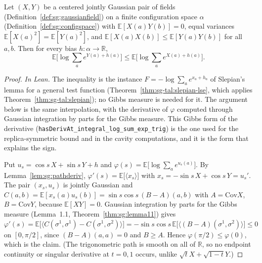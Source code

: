 \begin{theorem}\label{thm:sg:comparison}
  \leanok
Let $(X,Y)$ be a centered jointly Gaussian pair of fields (Definition~\ref{def:sg:gaussianfield}) on a finite configuration space $\alpha$ (Definition~\ref{def:sg:configspace}) with $\mathbb E[X(a)Y(b)]=0$, equal variances
$\mathbb E[X(a)^2]=\mathbb E[Y(a)^2]$, and $\mathbb E[X(a)X(b)]\le\mathbb E[Y(a)Y(b)]$ for all $a,b$. Then for every bias $h:\alpha\to\mathbb R$,
\[\mathbb E\big[\log\sum_ae^{Y(a)+h(a)}\big]\le\mathbb E\big[\log\sum_ae^{X(a)+h(a)}\big].\]
\end{theorem}

\begin{proof}
  \leanok
\emph{In Lean.} The inequality is the instance $F=-\log\sum_ae^{x_a+h_a}$ of Slepian's lemma for a general test function (Theorem~\ref{thm:sg-tal:slepian-lse}, which applies Theorem~\ref{thm:sg-tal:slepian}); no Gibbs measure is needed for it.
The argument below is the same interpolation, with the derivative of $\varphi$ computed through Gaussian integration by parts for the Gibbs measure. This Gibbs form of the derivative (\texttt{hasDerivAt\_integral\_log\_sum\_exp\_trig}) is the one used for the replica-symmetric bound and in the cavity computations, and it is the form that explains the sign.

Put $u_s=\cos s\,X+\sin s\,Y+h$ and $\varphi(s)=\mathbb E\big[\log\sum_ae^{u_s(a)}\big]$. By Lemma~\ref{lem:sg:pathderiv}, $\varphi'(s)=\mathbb E\big[\langle x_s\rangle\big]$
with $x_s=-\sin s\,X+\cos s\,Y=u_s'$. The pair $(x_s,u_s)$ is jointly Gaussian and
$C(a,b)=\mathbb E[x_s(a)u_s(b)]=\sin s\cos s\,(B-A)(a,b)$ with $A=\mathrm{Cov}X$, $B=\mathrm{Cov}Y$, because $\mathbb E[XY]=0$. Gaussian integration by
parts for the Gibbs measure (Lemma~1.1, Theorem~\ref{thm:sg:lemma11}) gives
$\varphi'(s)=\mathbb E\big[\langle C(\sigma^1,\sigma^1)-C(\sigma^1,\sigma^2)\rangle\big]=-\sin s\cos s\,\mathbb E\big[\langle(B-A)(\sigma^1,\sigma^2)\rangle\big]\le0$
on $[0,\pi/2]$, since $(B-A)(a,a)=0$ and $B\ge A$. Hence $\varphi(\pi/2)\le\varphi(0)$, which is the claim. (The trigonometric path is smooth on all of
$\mathbb R$, so no endpoint continuity or singular derivative at $t=0,1$ occurs, unlike $\sqrt tX+\sqrt{1-t}Y$.)
\end{proof}

